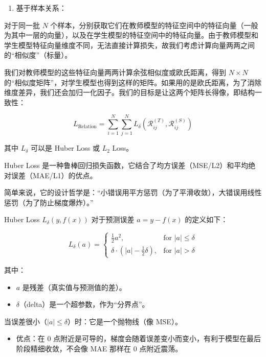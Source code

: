 \begin{enumerate}
\def\labelenumi{\arabic{enumi}.}
\setcounter{enumi}{2}
\tightlist
\item
{}
  基于样本关系：
\end{enumerate}

对于同一批 \(N\) 个样本，分别获取它们在教师模型的特征空间中的特征向量（一般为其中一层的向量），以及在学生模型的特征空间中的特征向量。由于教师模型和学生模型特征向量维度不同，无法直接计算损失，故我们考虑计算向量两两之间的``相似度''（标量）。

我们对教师模型的这些特征向量两两计算余弦相似度或欧氏距离，得到 \(N \times N\) 的``相似度矩阵''，对学生模型也得到这样的矩阵。如果用的是欧氏距离，为了消除维度差异，我们还会加归一化因子。我们的目标是让这两个矩阵长得像，即结构一致性：

\[
L_{\mathrm{Relation}} = \sum_{i=1}^{N} \sum_{j=1}^{N} L_\delta\left(\mathcal{R}_{ij}^{(T)}, \mathcal{R}_{ij}^{(S)}\right)
\]

其中 \(L_\delta\) 可以是 Huber Loss 或 \(L_2\) Loss。

Huber Loss 是一种鲁棒回归损失函数，它结合了均方误差（MSE/L2）和平均绝对误差（MAE/L1）的优点。

简单来说，它的设计哲学是：``小错误用平方惩罚（为了平滑收敛），大错误用线性惩罚（为了防止梯度爆炸）。''

Huber Loss \(L_\delta(y, f(x))\) 对于预测误差 \(a = y - f(x)\) 的定义如下：

\[
L_\delta(a) =
\begin{cases}
\frac{1}{2}a^2, & \text{for } |a| \le \delta \\
\delta \cdot \left(|a| - \frac{1}{2}\delta\right), & \text{for } |a| > \delta
\end{cases}
\]

其中：

\begin{itemize}
\tightlist
\item
  \(a\) 是残差（真实值与预测值的差）。
\item
  \(\delta\)（delta）是一个超参数，作为``分界点''。
\end{itemize}

当误差很小（\(|a| \le \delta\)）时：它是一个抛物线（像 MSE）。

\begin{itemize}
\tightlist
\item
  优点：在 0 点附近是可导的，梯度会随着误差变小而变小，有利于模型在最后阶段精细收敛，不会像 MAE 那样在 0 点附近震荡。
\end{itemize}

